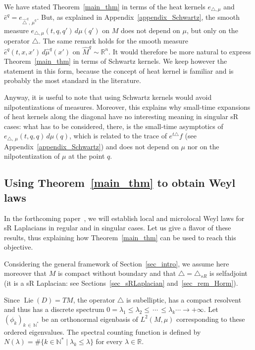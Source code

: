 \documentclass[AHL,Unicode,published]{cedram}
\newcommand*\R{\mathbb{R}}
\newcommand*\N{\mathbb{N}}
\DeclareMathOperator{\Lie}{Lie}
\renewcommand{\leq}{\leqslant}
\begin{document}
\begin{rema}
We have stated Theorem~\ref{main_thm} in terms of the heat kernels $e_{\triangle,\mu}$ and $\widehat{e}^{q} = e_{\widehat{\triangle}^{q},\,\widehat{\mu}^{q}} $. But, as explained in Appendix~\ref{appendix_Schwartz}, the smooth measure $e_{\triangle,\mu}(t,q,q')\, d\mu(q')$ on $M$ does not depend on $\mu$, but only on the operator $\triangle$. The same remark holds for the smooth measure $\widehat{e}^{q}(t,x,x')\, d\widehat{\mu}^{q}(x')$ on $\widehat{M}^q\sim\R^n$. It would therefore be more natural to express Theorem~\ref{main_thm} in terms of Schwartz kernels. We keep however the statement in this form, because the concept of heat kernel is familiar and is probably the most standard in the literature.

Anyway, it is useful to note that using Schwartz kernels would avoid nilpotentizations of measures. Moreover, this explains why small-time expansions of heat kernels along the diagonal have no interesting meaning in singular sR cases: what has to be considered, there, is the small-time asymptotics of $e_{\triangle,\,\mu}(t,q,q)\, d\mu(q)$, which is related to the trace of $e^{t\triangle}f$ (see Appendix~\ref{appendix_Schwartz}) and does not depend on $\mu$ nor on the nilpotentization of $\mu$ at the point $q$.
\end{rema}



\subsection{Using Theorem~\ref{main_thm} to obtain Weyl laws}\label{sec_useful}
In the forthcoming paper~\cite{CHT-II}, we will establish local and microlocal Weyl laws for sR Laplacians in regular and in singular cases. Let us give a flavor of these results, thus explaining how Theorem~\ref{main_thm} can be used to reach this objective.

Considering the general framework of Section~\ref{sec_intro}, we assume here moreover that $M$ is compact without boundary and that $\triangle = \triangle_{sR}$ is selfadjoint (it is a sR Laplacian: see Sections~\ref{sec_sRLaplacian} and~\ref{sec_rem_Horm}).

Since $\Lie(D) = TM$, the operator $\triangle$ is subelliptic, has a compact resolvent and thus has a discrete spectrum $0=\lambda_1\leq\lambda_2\leq\,\cdots\,\leq\lambda_k\cdots\rightarrow+\infty$. Let $(\phi_k)_{k\,\in\,\N^*}$ be an orthonormal eigenbasis of $L^2(M,\mu)$ corresponding to these ordered eigenvalues. The spectral counting function is defined by $N(\lambda) = \# \{k\in\N^* \mid \lambda_k \leq \lambda \}$ for every $\lambda\in\R$.
\end{document}
